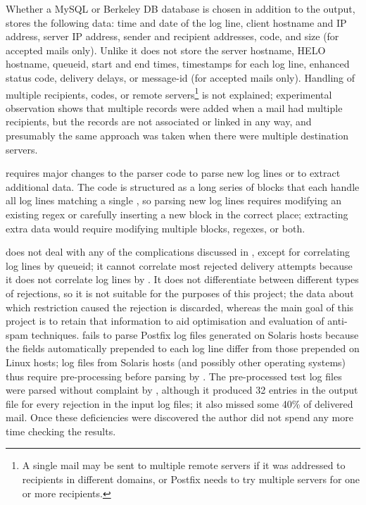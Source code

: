 Whether a MySQL or Berkeley DB database is chosen in addition to the
 output,  stores the following data: time and
date of the log line, client hostname and IP address, server IP address,
sender and recipient addresses,  code, and size (for accepted
mails only).  Unlike \parsername{} it does not store the server hostname,
HELO hostname, queueid, start and end times, timestamps for each log line,
enhanced status code, delivery delays, or message-id (for accepted mails
only).  Handling of multiple recipients,  codes, or remote
servers\footnote{A single mail may be sent to multiple remote servers if it
was addressed to recipients in different domains, or Postfix needs to try
multiple servers for one or more recipients.} is not explained;
experimental observation shows that multiple records were added when a mail
had multiple recipients, but the records are not associated or linked in
any way, and presumably the same approach was taken when there were
multiple destination servers.

 requires major changes to the parser code to parse new log
lines or to extract additional data.  The code is structured as a long
series of blocks that each handle all log lines matching a single
, so parsing new log lines requires modifying an existing
regex or carefully inserting a new block in the correct place; extracting
extra data would require modifying multiple blocks, regexes, or both.
\regexglossarydescription{}

 does not deal with any of the complications discussed in
, except for correlating log lines by queueid; it
cannot correlate most rejected delivery attempts because it does not
correlate log lines by .  It does not differentiate between
different types of rejections, so it is not suitable for the purposes of
this project; the data about which restriction caused the rejection is
discarded, whereas the main goal of this project is to retain that
information to aid optimisation and evaluation of anti-spam techniques.
 fails to parse Postfix log files generated on Solaris hosts
because the fields automatically prepended to each log line differ from
those prepended on Linux hosts; log files from Solaris hosts (and possibly
other operating systems) thus require pre-processing before parsing by
.  The \numberOFlogFILES{} pre-processed test log files were
parsed without complaint by , although it produced 32 entries
in the output  file for every rejection in the input log
files; it also missed some 40\% of delivered mail.  Once these deficiencies
were discovered the author did not spend any more time checking the
results.

